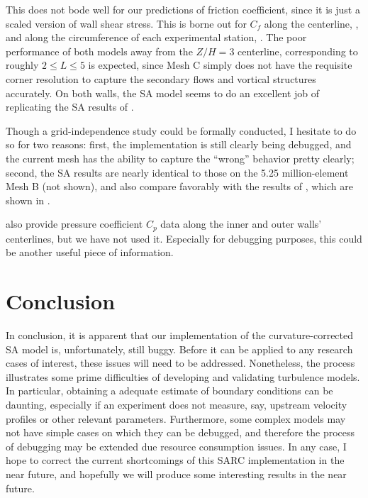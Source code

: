 \documentclass[11pt]{article}
\begin{document}
This does not bode well for our predictions of friction coefficient, since it is just a scaled version of wall shear stress. This is borne out for $C_f$ along the centerline, , and along the circumference of each experimental station, . The poor performance of both models away from the $Z/H=3$ centerline, corresponding to roughly $2 \le L \le 5$ is expected, since Mesh C simply does not have the requisite corner resolution to capture the secondary flows and vortical structures accurately. On both walls, the SA model seems to do an excellent job of replicating the SA results of \citet{shur2000}.

Though a grid-independence study could be formally conducted, I hesitate to do so for two reasons: first, the implementation is still clearly being debugged, and the current mesh has the ability to capture the ``wrong'' behavior pretty clearly; second, the SA results are nearly identical to those on the 5.25 million-element Mesh B (not shown), and also compare favorably with the results of \citep{shur2000}, which are shown in .

\citet{kim1994} also provide pressure coefficient $C_p$ data along the inner and outer walls' centerlines, but we have not used it. Especially for debugging purposes, this could be another useful piece of information.

\section{Conclusion}

In conclusion, it is apparent that our implementation of the curvature-corrected SA model is, unfortunately, still buggy. Before it can be applied to any research cases of interest, these issues will need to be addressed. Nonetheless, the process illustrates some prime difficulties of developing and validating turbulence models. In particular, obtaining a adequate estimate of boundary conditions can be daunting, especially if an experiment does not measure, say, upstream velocity profiles or other relevant parameters. Furthermore, some complex models may not have simple cases on which they can be debugged, and therefore the process of debugging may be extended due resource consumption issues. In any case, I hope to correct the current shortcomings of this SARC implementation in the near future, and hopefully we will produce some interesting results in the near future.
\end{document}
